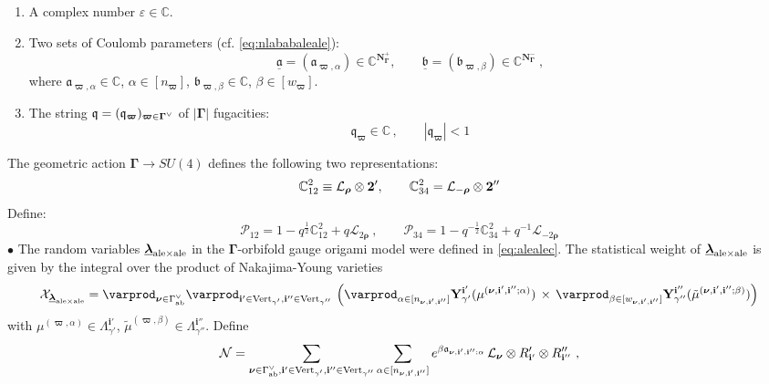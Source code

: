 \documentclass[12pt]{amsart}
\newcommand {\3}{\underline{\bf 3}}
\newcommand {\4}{\underline{\bf 4}}
\newcommand {\6}{\underline{\bf 6}}
\newcommand{\beq}{\begin{equation}}
\newcommand{\eeq}{\end{equation}}
\newcommand {\BC}   {\mathbb C}
\newcommand {\bN}   {\mathbf{N}}
\newcommand {\bY}   {\mathbf{Y}}
\newcommand {\qe} {\mathfrak q}
\newcommand {\ib} {\mathbf{i}}
\newcommand {\ba}  {\underline{\ac}}
\newcommand {\bb}  {\underline{\fb}}
\newcommand {\bnu} {{\boldsymbol{\nu}}}
\newcommand {\bro} {{\boldsymbol{\rho}}}
\newcommand {\bla} {\underline{\boldsymbol{\lambda}}}
\newcommand {\bom} {{\boldsymbol{\varpi}}}
\newcommand {\ac} {\mathfrak{a}}
\newcommand {\fb} {\mathfrak{b}}
\newcommand {\CalL} {\mathcal L}
\newcommand {\CalN} {\mathcal N}
\newcommand {\CalP} {\mathcal P}
\newcommand {\CalX} {\mathcal X}
\newcommand{\ve}{\varepsilon}
\newcommand{\Gammadi}{\boldsymbol{\Gamma}}
\newcommand{\Gamav}{{\Gamma}^{\vee}_{\rm ab}}
\begin{document}
\begin{enumerate}

\item
A complex number  ${\ve} \in {\BC}$. 
\item
Two sets of Coulomb parameters (cf. \eqref{eq:nlababaleale}): 
\beq
{\ba} = ( {\ac}_{{\bom}, {\alpha}} ) \in {\BC}^{{\bN}_{\Gammadi}^{+}}, \qquad {\bb} = ({\fb}_{{\bom}, {\beta}}) \in {\BC}^{{\bN}_{\Gammadi}^{-}} \ ,
\label{eq:acfb}
\eeq 
where ${\ac}_{\bom, \alpha} \in {\BC}$, ${\alpha} \in [n_{\bom}]$, ${\fb}_{\bom, {\beta}} \in {\BC}$, ${\beta} \in [w_{\bom}]$.
\item
The string ${\bf\qe} = ({\qe}_{\bom})_{\bom \in {\Gammadi}^{\vee}}$ of $\vert {\Gammadi} \vert$ fugacities:
\beq
{\qe}_{\bom} \in {\BC}\, , \qquad | {\qe}_{\bom} | < 1 
\eeq

\end{enumerate}
The geometric action ${\Gammadi} \to SU(4)$ defines the following two representations:
\beq
{\BC}^{2}_{12} \equiv {\CalL}_{\bro} \otimes {\bf 2}', \qquad
{\BC}^{2}_{34} = {\CalL}_{-\bro} \otimes {\bf 2}'' 
\eeq
Define:
\beq
{\CalP}_{12} = 1 - q^{\frac 12} {\BC}^{2}_{12} + q {\CalL}_{2\bro} \ , \qquad
{\CalP}_{34} = 1 - q^{-\frac 12} {\BC}^{2}_{34} + q^{-1} {\CalL}_{-2\bro}
 \eeq
 $\bullet$
 The random variables ${\bla}_{{\rm ale} \times {\rm ale}}$ in the $\Gammadi$-orbifold gauge origami model were defined 
 in \eqref{eq:alealec}. The statistical weight of ${\bla}_{{\rm ale} \times {\rm ale}}$
 is given by the integral over the product
 of Nakajima-Young varieties
 \beq
 {\CalX}_{{\bla}_{{\rm ale} \times {\rm ale}}} = 
 \varprod_{\bnu \in {\Gamav}} \varprod_{{\ib}'\in {\rm Vert}_{\gamma'}, {\ib}'' \in {\rm Vert}_{\gamma''}} \, \left( \varprod_{{\alpha} \in [n_{{\bnu}, {\ib}', {\ib}''}]} {\bY}^{\ib'}_{\gamma'} ( {\mu}^{({\bnu}, {\ib}', {\ib}''; {\alpha})} ) \, \times \, \varprod_{{\beta} \in [w_{{\bnu}, {\ib}', {\ib}''}]} {\bY}^{\ib''}_{\gamma''} ( {\tilde\mu}^{({\bnu}, {\ib}', {\ib}''; {\beta})} ) \right)
 \label{eq:alealecc}
 \eeq
with ${\mu}^{({\bom}, {\alpha})} \in {\Lambda}^{\ib'}_{\gamma'}$, ${\tilde\mu}^{({\bom}, {\beta})} \in {\Lambda}^{\ib''}_{\gamma''}$.
Define
\beq
{\CalN} = \sum\limits_{{\bnu} \in {\Gamav}, {\ib}' \in {\rm Vert}_{\gamma'},  
{\ib''} \in {\rm Vert}_{\gamma''}} \sum_{{\alpha} \in [n_{{\bnu}, {\ib}', {\ib}''}]} 
  e^{{\beta}{\ac}_{{\bnu}, {\ib}', {\ib}'';  {\alpha}}}  \, {\CalL}_{\bnu} 
\otimes R_{\ib'}' \otimes R_{\ib''}''  \ ,  \eeq
\end{document}
